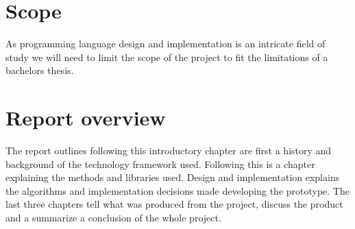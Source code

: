 \section{Scope}

As programming language design and implementation is an intricate field of study we will need to limit the scope of the project to fit the limitations of a bachelors thesis. 

\section{Report overview}

The report outlines following this introductory chapter are first a history and background of the technology framework used. Following this is a chapter explaining the methods and libraries used. Design and implementation explains the algorithms and implementation decisions made developing the prototype. The last three chapters tell what was produced from the project, discuss the product and a summarize a conclusion of the whole project.

